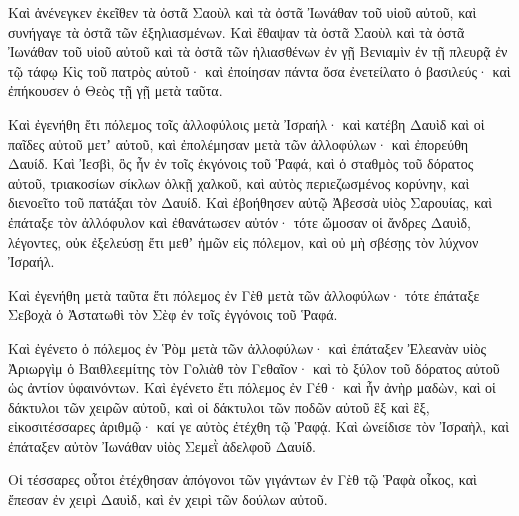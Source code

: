 {Καὶ ἁνένεγκεν ἐκεῖθεν τὰ ὀστᾶ Σαοὺλ καὶ τὰ ὀστᾶ Ἰωνάθαν τοῦ υἱοῦ αὐτοῦ, καὶ συνήγαγε τὰ ὀστᾶ τῶν ἐξηλιασμένων.
Καὶ ἔθαψαν τὰ ὀστᾶ Σαοὺλ καὶ τὰ ὀστᾶ Ἰωνάθαν τοῦ υἱοῦ αὐτοῦ καὶ τὰ ὀστᾶ τῶν ἡλιασθένων ἐν γῇ Βενιαμὶν ἐν τῇ πλευρᾷ ἐν τῷ τάφῳ Κὶς τοῦ πατρὸς αὐτοῦ· καὶ ἐποίησαν πάντα ὅσα ἐνετείλατο ὁ βασιλεύς· καὶ ἐπήκουσεν ὁ Θεὸς τῇ γῇ μετὰ ταῦτα.
\par }{\PP {}Καὶ ἐγενήθη ἔτι πόλεμος τοῖς ἀλλοφύλοις μετὰ Ἰσραήλ· καὶ κατέβη Δαυὶδ καὶ οἱ παῖδες αὐτοῦ μετʼ αὐτοῦ, καὶ ἐπολέμησαν μετὰ τῶν ἀλλοφύλων· καὶ ἐπορεύθη Δαυίδ.
Καὶ Ἰεσβὶ, ὃς ἦν ἐν τοῖς ἐκγόνοις τοῦ Ῥαφά, καὶ ὁ σταθμὸς τοῦ δόρατος αὐτοῦ, τριακοσίων σίκλων ὁλκῇ χαλκοῦ, καὶ αὐτὸς περιεζωσμένος κορύνην, καὶ διενοεῖτο τοῦ πατάξαι τὸν Δαυίδ.
Καὶ ἐβοήθησεν αὐτῷ Ἀβεσσὰ υἱὸς Σαρουίας, καὶ ἐπάταξε τὸν ἀλλόφυλον καὶ ἐθανάτωσεν αὐτόν· τότε ὤμοσαν οἱ ἄνδρες Δαυὶδ, λέγοντες, οὐκ ἐξελεύσῃ ἔτι μεθʼ ἡμῶν εἰς πόλεμον, καὶ οὐ μὴ σβέσῃς τὸν λύχνον Ἰσραήλ.
\par }{\PP {}Καὶ ἐγενήθη μετὰ ταῦτα ἔτι πόλεμος ἐν Γὲθ μετὰ τῶν ἀλλοφύλων· τότε ἐπάταξε Σεβοχὰ ὁ Ἀστατωθὶ τὸν Σὲφ ἐν τοῖς ἐγγόνοις τοῦ Ῥαφά.
\par }{\PP {}Καὶ ἐγένετο ὁ πόλεμος ἐν Ῥὸμ μετὰ τῶν ἀλλοφύλων· καὶ ἐπάταξεν Ἐλεανὰν υἱὸς Ἀριωργὶμ ὁ Βαιθλεεμίτης τὸν Γολιὰθ τὸν Γεθαῖον· καὶ τὸ ξύλον τοῦ δόρατος αὐτοῦ ὡς ἀντίον ὑφαινόντων.
Καὶ ἐγένετο ἔτι πόλεμος ἐν Γέθ· καὶ ἦν ἀνὴρ μαδὼν, καὶ οἱ δάκτυλοι τῶν χειρῶν αὐτοῦ, καὶ οἱ δάκτυλοι τῶν ποδῶν αὐτοῦ ἓξ καὶ ἓξ, εἰκοσιτέσσαρες ἀριθμῷ· καί γε αὐτὸς ἐτέχθη τῷ Ῥαφᾴ.
Καὶ ὠνείδισε τὸν Ἰσραὴλ, καὶ ἐπάταξεν αὐτὸν Ἰωνάθαν υἱὸς Σεμεῒ ἀδελφοῦ Δαυίδ.
\par }{\PP {}Οἱ τέσσαρες οὗτοι ἐτέχθησαν ἀπόγονοι τῶν γιγάντων ἐν Γὲθ τῷ Ῥαφὰ οἶκος, καὶ ἔπεσαν ἐν χειρὶ Δαυὶδ, καὶ ἐν χειρὶ τῶν δούλων αὐτοῦ.

}
